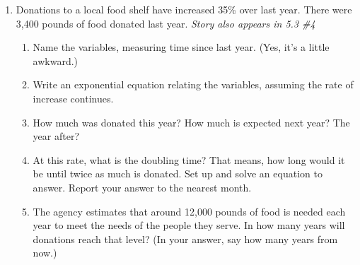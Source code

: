 \begin{enumerate}
\item Donations to a local food shelf have increased 35\% over last year.  There were 3,400 pounds of food donated last year. \hfill \emph{Story also appears in 5.3 \#4}
\begin{enumerate}
\item Name the variables, measuring time since last year.  (Yes, it's a little awkward.)
\item Write an exponential equation relating the variables, assuming the rate of increase continues.
\item How much was donated this year?  How much is expected next year?  The year after?
\item At this rate, what is the doubling time?  That means, how long would it be until twice as much is donated.  Set up and solve an equation to answer.  Report your answer to the nearest month.
\item The agency estimates that around 12,000 pounds of food is needed each year to meet the needs of the people they serve.  In how many years will donations reach that level?  (In your answer, say how many years from now.)
\end{enumerate}


\end{enumerate}